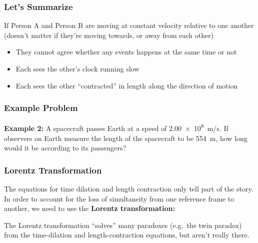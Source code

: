 \documentclass[12pt,compress,aspectratio=169]{beamer}
\begin{document}
\begin{frame}
  \frametitle{Let's Summarize}
  \begin{center}
  \end{center}
  If Person A and Person B are moving at constant velocity relative to one 
  another (doesn't matter if they're moving towards, or away from each other)
  \begin{itemize}
  \item They cannot agree whether any events happens at the same time or not
  \item Each sees the other's clock running slow
  \item Each sees the other ``contracted'' in length along the direction of
    motion
  \end{itemize}
\end{frame}

\begin{frame}
  \frametitle{Example Problem}
  \textbf{Example 2:} A spacecraft passes Earth at a speed of \SI{2.00e8}{m/s}.
  If observers on Earth measure the length of the spacecraft to be
  \SI{554}{m}, how long would it be according to its passengers?
\end{frame}


\begin{frame}
  \frametitle{Lorentz Transformation}
  The equations for time dilation and length contraction only tell part of the
  story. In order to account for the loss of simultaneity from one reference
  frame to another, we need to use the \textbf{Lorentz transformation:}

  
  \vspace{-.1in}The Lorentz transformation ``solves'' many paradoxes
  (e.g.\ the twin paradox) from the time-dilation and
  length-contraction equations, but aren't really there.
\end{frame}
\end{document}
